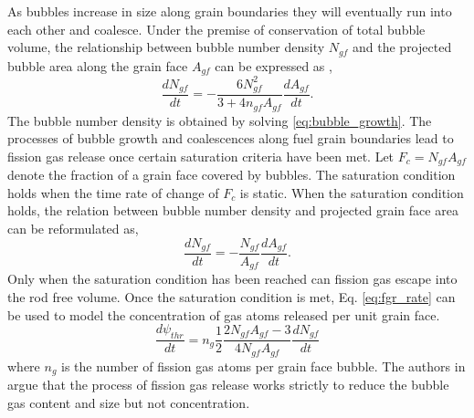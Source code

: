 As bubbles increase in size along grain boundaries they will eventually run into each other and coalesce. Under the premise of conservation of total bubble volume, the relationship between bubble number density $N_{gf}$ and the projected bubble area along the grain face $A_{gf}$ can be expressed as \cite{Pastore3},
\begin{equation}
\label{eq:bubble_coalesecence}
 \frac{dN_{gf}}{dt} = -\frac{6N_{gf}^2}{3+4n_{gf}A_{gf}} \frac{dA_{gf}}{dt}.
\end{equation}
The bubble number density is obtained by solving \ref{eq:bubble_growth}. The processes of bubble growth and coalescences along fuel grain boundaries lead to fission gas release once certain saturation criteria have been met. Let $F_c = N_{gf}A_{gf}$ denote the fraction of a grain face covered by bubbles. The saturation condition holds when the time rate of change of $F_c$ is static. When the saturation condition holds, the relation between bubble number density and projected grain face area can be reformulated as,
\begin{equation}
\label{eq:bubble_coalesecence_sat}
 \frac{dN_{gf}}{dt} = -\frac{N_{gf}}{A_{gf}} \frac{dA_{gf}}{dt}.
\end{equation}
Only when the saturation condition has been reached can fission gas escape into the rod free volume. Once the saturation condition is met, Eq. \ref{eq:fgr_rate} can be used to model the concentration of gas atoms released per unit grain face. 
\begin{equation}
\label{eq:fgr_rate}
 \frac{d\psi_{thr}}{dt} = n_g \frac{1}{2} \frac{2N_{gf}A_{gf} - 3}{4N_{gf}A_{gf}} \frac{dN_{gf}}{dt}
\end{equation}      
where $n_g$ is the number of fission gas atoms per grain face bubble. The authors in \cite{Pastore3} argue that the process of fission gas release works strictly to reduce the bubble gas content and size but not concentration. 

